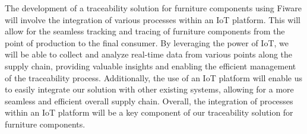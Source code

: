
The development of a traceability solution for furniture components using Fiware will involve the integration of various processes within an IoT platform. This will allow for the seamless tracking and tracing of furniture components from the point of production to the final consumer. By leveraging the power of IoT, we will be able to collect and analyze real-time data from various points along the supply chain, providing valuable insights and enabling the efficient management of the traceability process. Additionally, the use of an IoT platform will enable us to easily integrate our solution with other existing systems, allowing for a more seamless and efficient overall supply chain. Overall, the integration of processes within an IoT platform will be a key component of our traceability solution for furniture components.

\bigskip


